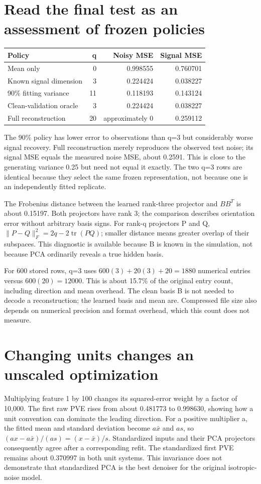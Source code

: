 \section{Read the final test as an assessment of frozen policies}
\begin{center}\begin{tabular}{lrrr}\toprule
Policy&q&Noisy MSE&Signal MSE\\\midrule
Mean only&0&0.998555&0.760701\\
Known signal dimension&3&0.224424&0.038227\\
90\% fitting variance&11&0.118193&0.143124\\
Clean-validation oracle&3&0.224424&0.038227\\
Full reconstruction&20&approximately 0&0.259112\\\bottomrule\end{tabular}\end{center}
The 90\% policy has lower error to observations than q=3 but considerably worse signal recovery.
Full reconstruction merely reproduces the observed test noise; its signal MSE equals the measured noise MSE, about 0.2591.
This is close to the generating variance 0.25 but need not equal it exactly.
The two q=3 rows are identical because they select the same frozen representation, not because one is an independently fitted replicate.

The Frobenius distance between the learned rank-three projector and $BB^T$ is about 0.15197.
Both projectors have rank 3; the comparison describes orientation error without arbitrary basis signs.
For rank-q projectors P and Q,
$\|P-Q\|_F^2=2q-2\operatorname{tr}(PQ)$; smaller distance means greater overlap of their subspaces.
This diagnostic is available because B is known in the simulation, not because PCA ordinarily reveals a true hidden basis.

For 600 stored rows, q=3 uses $600(3)+20(3)+20=1880$ numerical entries versus $600(20)=12000$.
This is about 15.7\% of the original entry count, including direction and mean overhead.
The clean basis B is not needed to decode a reconstruction; the learned basis and mean are.
Compressed file size also depends on numerical precision and format overhead, which this count does not measure.

\section{Changing units changes an unscaled optimization}
Multiplying feature 1 by 100 changes its squared-error weight by a factor of 10,000.
The first raw PVE rises from about 0.481773 to 0.998630, showing how a unit convention can dominate the leading direction.
For a positive multiplier a, the fitted mean and standard deviation become $a\bar x$ and $as$,
so $(ax-a\bar x)/(as)=(x-\bar x)/s$. Standardized inputs and their PCA projectors consequently agree after a corresponding refit.
The standardized first PVE remains about 0.370997 in both unit systems.
This invariance does not demonstrate that standardized PCA is the best denoiser for the original isotropic-noise model.

